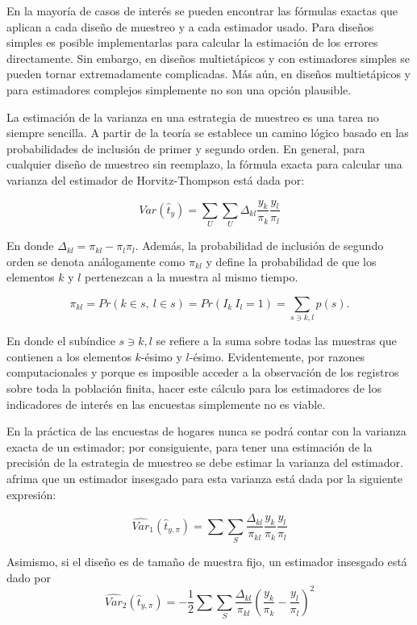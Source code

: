 \documentclass[
  10pt,
  spanish,
]{book}
\begin{document}
En la mayoría de casos de interés se pueden encontrar las fórmulas exactas que aplican a cada diseño de muestreo y a cada estimador usado. Para diseños simples es posible implementarlas para calcular la estimación de los errores directamente. Sin embargo, en diseños multietápicos y con estimadores simples se pueden tornar extremadamente complicadas. Más aún, en diseños multietápicos y para estimadores complejos simplemente no son una opción plausible.

La estimación de la varianza en una estrategia de muestreo es una tarea no siempre sencilla. A partir de la teoría se establece un camino lógico basado en las probabilidades de inclusión de primer y segundo orden. En general, para cualquier diseño de muestreo sin reemplazo, la fórmula exacta para calcular una varianza del estimador de Horvitz-Thompson está dada por:

\[Var(\hat{t}_y) = \sum_U\sum_U \Delta_{kl}\frac{y_k}{\pi_k}\frac{y_l}{\pi_l}\]

En donde \(\Delta_{kl} = \pi_{kl} - \pi_l \pi_l\). Además, la probabilidad de inclusión de segundo orden se denota análogamente como \(\pi_{kl}\) y define la probabilidad de que los elementos \(k\) y \(l\) pertenezcan a la muestra al mismo tiempo.

\[
\pi_{kl}=Pr(k\in s, \  l\in s)=Pr(I_k\ I_l=1)=\sum_{s \ni k, l} p(s).
\]

En donde el subíndice \({s \ni k, l}\) se refiere a la suma sobre todas las muestras que contienen a los elementos \(k\)-ésimo y \(l\)-ésimo. Evidentemente, por razones computacionales y porque es imposible acceder a la observación de los registros sobre toda la población finita, hacer este cálculo para los estimadores de los indicadores de interés en las encuestas simplemente no es viable.

En la práctica de las encuestas de hogares nunca se podrá contar con la varianza exacta de un estimador; por consiguiente, para tener una estimación de la precisión de la estrategia de muestreo se debe estimar la varianza del estimador. \citet{Gutierrez_2016} afrima que un estimador insesgado para esta varianza está dada por la siguiente expresión:

\[
    \widehat{Var}_1(\hat{t}_{y,\pi})=\sum\sum_S \dfrac{\Delta_{kl}}{\pi_{kl}}\frac{y_k}{\pi_k}\frac{y_l}{\pi_l}
\]

Asimismo, si el diseño es de tamaño de muestra fijo, un estimador insesgado está dado por
\[
\widehat{Var}_2(\hat{t}_{y,\pi})=-\frac{1}{2}\sum\sum_S\frac{\Delta_{kl}}{\pi_{kl}}\left(\frac{y_k}{\pi_k}-\frac{y_l}{\pi_l}\right)^2
\]
\end{document}
